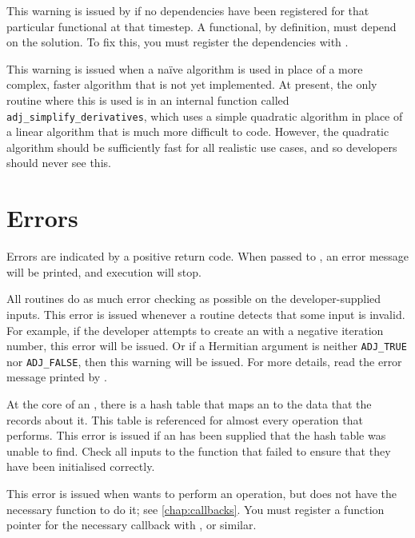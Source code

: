 This warning is issued by  if no dependencies have been
registered for that particular functional at that timestep. A functional, by definition, must depend on the solution. To fix this, you must register the dependencies with
.

This warning is issued when a na\"ive algorithm is used in place of a more complex,
faster algorithm that is not yet implemented. At present, the only routine where
this is used is in an internal function called \texttt{adj_simplify_derivatives}, which uses a simple quadratic
algorithm in place of a linear algorithm that is much more difficult to code.
However, the quadratic algorithm should be sufficiently fast for all realistic
use cases, and so developers should never see this.

\section{Errors}
Errors are indicated by a positive return code. When passed to ,
an error message will be printed, and execution will stop.

All \libadjoint routines do as much error checking as possible
on the developer-supplied inputs. This error is issued whenever a \libadjoint routine
detects that some input is invalid. For example, if the developer attempts to create
an  with a negative iteration number, this error will be issued. Or
if a Hermitian argument is neither \texttt{ADJ_TRUE} nor \texttt{ADJ_FALSE}, then this warning
will be issued. For more details, read the error message printed by .

At the core of an , there is a hash table that maps an
 to the data that the  records about it.
This table is referenced for almost every operation that \libadjoint performs. This error
is issued if an  has been supplied that the hash table was
unable to find. Check all  inputs to the function that failed to ensure that they have been
initialised correctly.

This error is issued when \libadjoint wants to perform an operation, but does
not have the necessary function to do it; see \autoref{chap:callbacks}. You
must register a function pointer for the necessary callback with ,
 or similar.

